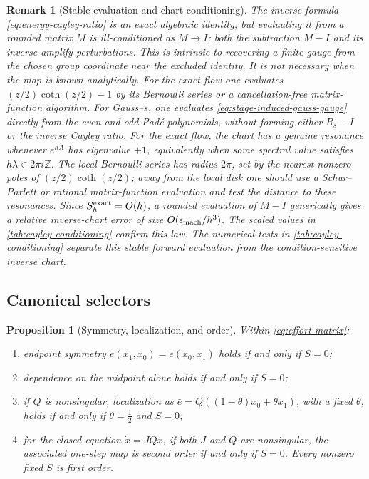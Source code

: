 \documentclass[11pt,a4paper]{article}
\newtheorem{proposition}[theorem]{Proposition}
\newtheorem{remark}[theorem]{Remark}
\begin{document}
\begin{remark}[Stable evaluation and chart conditioning]
\label{rem:cayley-conditioning}
The inverse formula \cref{eq:energy-cayley-ratio} is an exact algebraic
identity, but evaluating it from a rounded matrix \(M\) is ill-conditioned
as \(M\to I\): both the subtraction \(M-I\) and its inverse amplify
perturbations.  This is intrinsic to recovering a finite gauge from the
chosen group coordinate near the excluded identity.  It is not necessary
when the map is known analytically.  For the exact flow one evaluates
\((z/2)\coth(z/2)-1\) by its Bernoulli series or a cancellation-free
matrix-function algorithm.  For Gauss--\(s\), one evaluates
\cref{eq:stage-induced-gauss-gauge} directly from the even and odd Pad\'e
polynomials, without forming either \(R_s-I\) or the inverse Cayley ratio.
For the exact flow, the chart has a genuine resonance whenever
\(e^{hA}\) has eigenvalue \(+1\), equivalently when some spectral value
satisfies \(h\lambda\in2\pi i\mathbb Z\).  The local Bernoulli series has
radius \(2\pi\), set by the nearest nonzero poles of
\((z/2)\coth(z/2)\); away from the local disk one should use a
Schur--Parlett or rational matrix-function evaluation and test the
distance to these resonances.  Since \(S_h^{\rm exact}=O(h)\), a rounded
evaluation of \(M-I\) generically gives a \emph{relative} inverse-chart
error of size \(O(\epsilon_{\rm mach}/h^3)\).  The scaled values in
\cref{tab:cayley-conditioning} confirm this law.
The numerical tests in \cref{tab:cayley-conditioning} separate this
stable forward evaluation from the condition-sensitive inverse chart.
\end{remark}

\subsection{Canonical selectors}

\begin{proposition}[Symmetry, localization, and order]\label{prop:selectors}
Within \cref{eq:effort-matrix}:
\begin{enumerate}
  \item endpoint symmetry
  \(\bar e(x_1,x_0)=\bar e(x_0,x_1)\) holds if and only if \(S=0\);
  \item dependence on the midpoint alone holds if and only if \(S=0\);
  \item if \(Q\) is nonsingular, localization as
  \(\bar e=Q((1-\theta)x_0+\theta x_1)\), with a fixed
  \(\theta\), holds if and only if \(\theta=\tfrac12\) and \(S=0\);
  \item for the closed equation \(\dot x=JQx\), if both \(J\) and \(Q\)
  are nonsingular, the associated one-step map is second order if and only
  if \(S=0\). Every nonzero fixed \(S\) is first order.
\end{enumerate}
\end{proposition}
\end{document}
